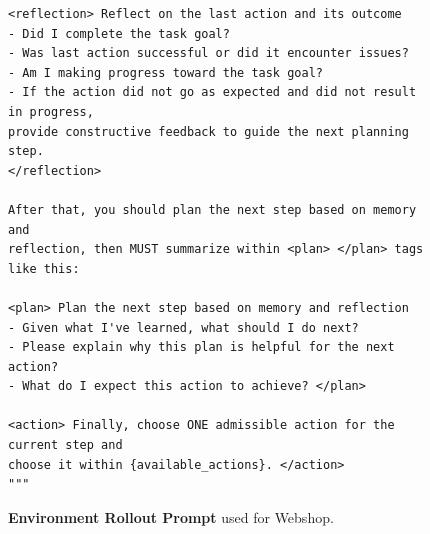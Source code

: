 \begin{figure}[htbp]
\begin{tcolorbox}
\begin{verbatim}
<reflection> Reflect on the last action and its outcome
- Did I complete the task goal?
- Was last action successful or did it encounter issues?
- Am I making progress toward the task goal?
- If the action did not go as expected and did not result in progress, 
provide constructive feedback to guide the next planning step. 
</reflection>

After that, you should plan the next step based on memory and 
reflection, then MUST summarize within <plan> </plan> tags like this:

<plan> Plan the next step based on memory and reflection
- Given what I've learned, what should I do next?
- Please explain why this plan is helpful for the next action?
- What do I expect this action to achieve? </plan>

<action> Finally, choose ONE admissible action for the current step and 
choose it within {available_actions}. </action>
"""
\end{verbatim}
\end{tcolorbox}

\caption{\textbf{Environment Rollout Prompt} used for Webshop.}
\label{fig:taskscore_prompt}
\end{figure}

